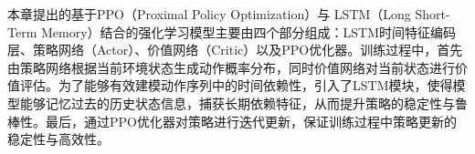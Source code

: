 

本章提出的基于PPO（Proximal Policy Optimization）与 LSTM（Long Short-Term Memory）结合的强化学习模型主要由四个部分组成：LSTM时间特征编码层、策略网络（Actor）、价值网络（Critic）以及PPO优化器。训练过程中，首先由策略网络根据当前环境状态生成动作概率分布，同时价值网络对当前状态进行价值评估。为了能够有效建模动作序列中的时间依赖性，引入了LSTM模块，使得模型能够记忆过去的历史状态信息，捕获长期依赖特征，从而提升策略的稳定性与鲁棒性。最后，通过PPO优化器对策略进行迭代更新，保证训练过程中策略更新的稳定性与高效性。


